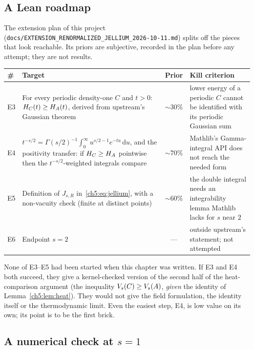 \subsection{A Lean roadmap}

The extension plan of this project (\texttt{docs/EXTENSION\_RENORMALIZED\_JELLIUM\_2026-10-11.md}) splits off
the pieces that look reachable. Its priors are subjective, recorded in the plan before any attempt; they are not
results.

\begin{center}\small
\begin{tabular}{@{}lp{6.8cm}cp{3.6cm}@{}}
\toprule
\# & Target & Prior & Kill criterion\\
\midrule
E3 & For every periodic density-one $C$ and $t>0$: $H_C(t)\ge H_A(t)$, derived from upstream's Gaussian theorem
  & $\sim30\%$ & lower energy of a periodic $C$ cannot be identified with its periodic Gaussian sum\\
E4 & $t^{-s/2}=\Gamma(s/2)^{-1}\int_0^\infty u^{s/2-1}e^{-tu}\,\mathrm{d}u$, and the positivity transfer: if
  $H_C\ge H_A$ pointwise then the $t^{-s/2}$-weighted integrals compare & $\sim70\%$ & Mathlib's Gamma-integral
  API does not reach the needed form\\
E5 & Definition of $J_{s,R}$ in~\eqref{ch5:eq:jellium}, with a non-vacuity check (finite at distinct points) &
  $\sim60\%$ & the double integral needs an integrability lemma Mathlib lacks for $s$ near $2$\\
E6 & Endpoint $s=2$ & --- & outside upstream's statement; not attempted\\
\bottomrule
\end{tabular}
\end{center}

None of E3--E5 had been started when this chapter was written. If E3 and E4 both succeed, they give a kernel-checked
version of the second half of the heat-comparison argument (the inequality $V_s(C)\ge V_s(A)$, \emph{given} the
identity of Lemma~\ref{ch5:lem:heat}). They would not give the field formulation, the identity itself or the
thermodynamic limit. Even the easiest step, E4, is low value on its own; its point is to be the first brick.

\subsection{A numerical check at \texorpdfstring{$s=1$}{s=1}}

